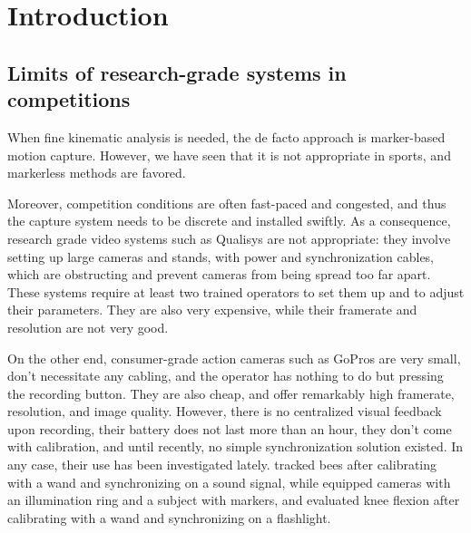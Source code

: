 \newpage

\section{Introduction}

\subsection{Limits of research-grade systems in competitions}

When fine kinematic analysis is needed, the de facto approach is marker-based motion capture. However, we have seen that it is not appropriate in sports, and markerless methods are favored.


Moreover, competition conditions are often fast-paced and congested, and thus the capture system needs to be discrete and installed swiftly. As a consequence, research grade video systems such as Qualisys are not appropriate: they involve setting up large cameras and stands, with power and synchronization cables, which are obstructing and prevent cameras from being spread too far apart. These systems require at least two trained operators to set them up and to adjust their parameters. They are also very expensive, while their framerate and resolution are not very good. 

On the other end, consumer-grade action cameras such as GoPros are very small, don't necessitate any cabling, and the operator has nothing to do but pressing the recording button. They are also cheap, and offer remarkably high framerate, resolution, and image quality. However, there is no centralized visual feedback upon recording, their battery does not last more than an hour, they don't come with calibration, and until recently, no simple synchronization solution existed. In any case, their use has been investigated lately. \cite{Jackson2016} tracked bees after calibrating with a wand and synchronizing on a sound signal, while \cite{Dalla2019} equipped cameras with an illumination ring and a subject with markers, and evaluated knee flexion after calibrating with a wand and synchronizing on a flashlight.

